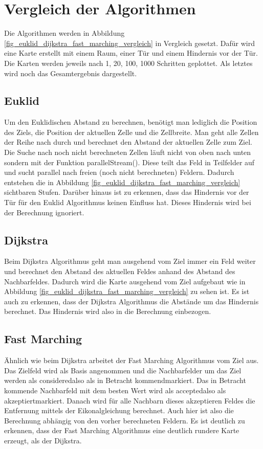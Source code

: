 \section{Vergleich der Algorithmen}
Die Algorithmen werden in Abbildung \ref{fig_euklid_dijkstra_fast_marching_vergleich} in Vergleich gesetzt. Dafür wird eine Karte erstellt mit einem Raum, einer Tür und einem Hindernis vor der Tür. Die Karten werden jeweils nach 1, 20, 100, 1000 Schritten geplottet. Als letztes wird noch das Gesamtergebnis dargestellt.

\subsection{Euklid}
Um den Euklidischen Abstand zu berechnen, benötigt man lediglich die Position des Ziels, die Position der aktuellen Zelle und die Zellbreite. Man geht alle Zellen der Reihe nach durch und berechnet den Abstand der aktuellen Zelle zum Ziel. Die Suche nach noch nicht berechneten Zellen läuft nicht von oben nach unten sondern mit der Funktion \glqq parallelStream()\grqq . Diese teilt das Feld in Teilfelder auf und sucht parallel nach freien (noch nicht berechneten) Feldern. Dadurch entstehen die in Abbildung \ref{fig_euklid_dijkstra_fast_marching_vergleich} sichtbaren Stufen. \cite{JavaParallelism} Darüber hinaus ist zu erkennen, dass das Hindernis vor der Tür für den Euklid Algorithmus keinen Einfluss hat. Dieses Hindernis wird bei der Berechnung ignoriert.

\subsection{Dijkstra}
Beim Dijkstra Algorithmus geht man ausgehend vom Ziel immer ein Feld weiter und berechnet den Abstand des aktuellen Feldes anhand des Abstand des Nachbarfeldes. Dadurch wird die Karte ausgehend vom Ziel aufgebaut wie in Abbildung \ref{fig_euklid_dijkstra_fast_marching_vergleich} zu sehen ist. Es ist auch zu erkennen, dass der Dijkstra Algorithmus die Abstände um das Hindernis berechnet. Das Hindernis wird also in die Berechnung einbezogen.

\subsection{Fast Marching}
Ähnlich wie beim Dijkstra arbeitet der Fast Marching Algorithmus vom Ziel aus. Das Zielfeld wird als Basis angenommen und die Nachbarfelder um das Ziel werden als \glqq considered\grqq  also als \glqq in Betracht kommend\grqq  markiert. Das in Betracht kommende Nachbarfeld mit dem besten Wert wird als \glqq accepted\grqq  also als \glqq akzeptiert\grqq  markiert. Danach wird für alle Nachbarn dieses akzeptieren Feldes die Entfernung mittels der Eikonalgleichung berechnet. Auch hier ist also die Berechnung abhängig von den vorher berechneten Feldern. Es ist deutlich zu erkennen, dass der Fast Marching Algorithmus eine deutlich rundere Karte erzeugt, als der Dijkstra.

